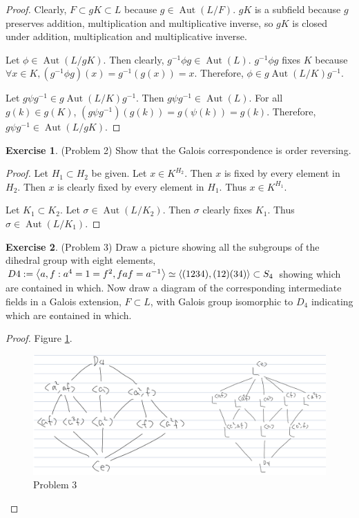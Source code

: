 \documentclass[12pt, psamsfonts]{amsart}
\theoremstyle{definition}
\newtheorem*{exer}{Exercise}
\theoremstyle{remark}
\DeclareMathOperator{\Aut}{Aut}
\numberwithin{equation}{section}
\begin{document}
\begin{proof}
  Clearly, $F \subset gK \subset L$ because $g \in \Aut(L / F)$.
  $gK$ is a subfield because $g$ preserves addition, multiplication and multiplicative inverse, so $gK$ is closed under addition, multiplication and multiplicative inverse.

  Let $\phi \in \Aut(L/gK)$.
  Then clearly, $g^{-1}\phi g \in \Aut(L)$.
  $g^{-1}\phi g$ fixes $K$ because $\forall x \in K, (g^{-1}\phi g)(x) = g^{-1}(g(x)) = x$.
  Therefore, $\phi \in g\Aut(L/K)g^{-1}$.

  Let $g\psi g^{-1} \in g\Aut(L/K)g^{-1}$.
  Then $g\psi g^{-1} \in \Aut(L)$.
  For all $g(k) \in g(K)$, $(g\psi g^{-1})(g(k)) = g(\psi(k)) = g(k)$.
  Therefore, $g\psi g^{-1} \in \Aut(L/gK)$.
\end{proof}

\begin{exer}{(Problem 2)}
  Show that the Galois correspondence is order reversing.
\end{exer}

\begin{proof}
  Let $H_1 \subset H_2$ be given.
  Let $x \in K^{H_2}$.
  Then $x$ is fixed by every element in $H_2$.
  Then $x$ is clearly fixed by every element in $H_1$.
  Thus $x \in K^{H_1}$.

  Let $K_1 \subset K_2$.
  Let $\sigma \in \Aut(L/K_2)$.
  Then $\sigma$ clearly fixes $K_1$.
  Thus $\sigma \in \Aut(L/K_1)$.
\end{proof}


\begin{exer}{(Problem 3)}
  Draw a picture showing all the subgroups of the dihedral group with eight elements, $D4 := \ev{a , f: a^4 = 1 = f^2, faf = a^{-1}} \simeq \ev{(1234),(12)(34)} \subset S_4$ showing which are contained in which.
  Now draw a diagram of the corresponding intermediate fields in a Galois extension, $F \subset L$, with Galois group isomorphic to $D_4$ indicating which are ¢ontained in which.
\end{exer}

\begin{proof}
  Figure \ref{fig:problem3}.
  \begin{figure}
    \includegraphics[width=\linewidth]{problem3.jpg}
    \caption{Problem 3}
    \label{fig:problem3}
  \end{figure}
\end{proof}
\end{document}
